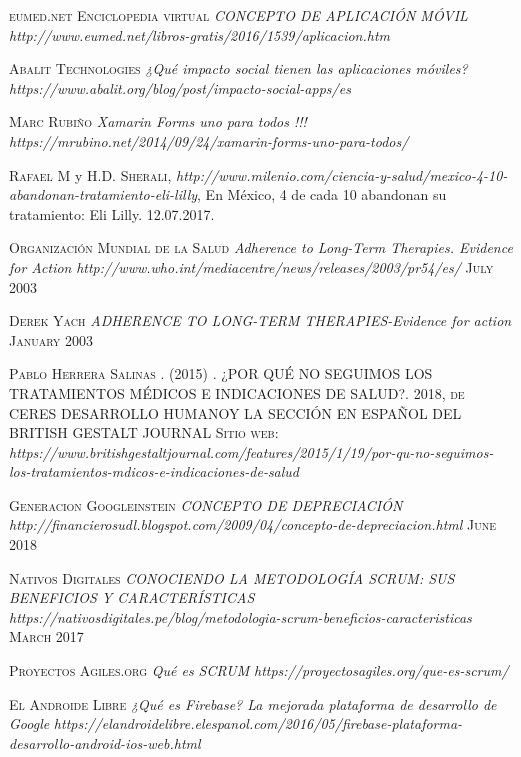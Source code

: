 \begin{thebibliography}{X}
	 \textsc{eumed.net Enciclopedia virtual} \textit{CONCEPTO DE APLICACIÓN MÓVIL} \textit{http://www.eumed.net/libros-gratis/2016/1539/aplicacion.htm}
	
	 \textsc{Abalit Technologies} \textit{¿Qué impacto social tienen las aplicaciones móviles?} \textit{https://www.abalit.org/blog/post/impacto-social-apps/es}
	
	 \textsc{Marc Rubiño} \textit{Xamarin Forms uno para todos !!!} \textit{https://mrubino.net/2014/09/24/xamarin-forms-uno-para-todos/}
	
	 \textsc{Rafael M} y \textsc{H.D. Sherali},
	\textit{http://www.milenio.com/ciencia-y-salud/mexico-4-10-abandonan-tratamiento-eli-lilly},  En México, 4 de cada 10 abandonan su tratamiento: Eli Lilly. 12.07.2017.
	
	 \textsc{Organización Mundial de la Salud} \textit{Adherence to Long-Term Therapies. Evidence for Action} \textit{http://www.who.int/mediacentre/news/releases/2003/pr54/es/} \textsc{July 2003}
	
	 \textsc{Derek Yach} \textit{ADHERENCE TO LONG-TERM THERAPIES-Evidence for action
} \textsc{January 2003}
	
	 \textsc{Pablo Herrera Salinas . (2015)} \textsc{. ¿POR QUÉ NO SEGUIMOS LOS TRATAMIENTOS MÉDICOS E INDICACIONES DE SALUD?. 2018, de CERES DESARROLLO HUMANOY LA SECCIÓN EN ESPAÑOL DEL BRITISH GESTALT JOURNAL Sitio web:} \textit{https://www.britishgestaltjournal.com/features/2015/1/19/por-qu-no-seguimos-los-tratamientos-mdicos-e-indicaciones-de-salud}

	 \textsc{Generacion Googleinstein} \textit{CONCEPTO DE DEPRECIACIÓN} \textit{http://financierosudl.blogspot.com/2009/04/concepto-de-depreciacion.html} \textsc{June 2018}
	
	 \textsc{Nativos Digitales} \textit{CONOCIENDO LA METODOLOGÍA SCRUM: SUS BENEFICIOS Y CARACTERÍSTICAS} \textit{https://nativosdigitales.pe/blog/metodologia-scrum-beneficios-caracteristicas} \textsc{March 2017}
	
	 \textsc{Proyectos Agiles.org} \textit{Qué es SCRUM} \textit{https://proyectosagiles.org/que-es-scrum/} 
	
	 \textsc{El Androide Libre} \textit{¿Qué es Firebase? La mejorada plataforma de desarrollo de Google} \textit{https://elandroidelibre.elespanol.com/2016/05/firebase-plataforma-desarrollo-android-ios-web.html} 
	
	
		 
	
	 
\end{thebibliography}